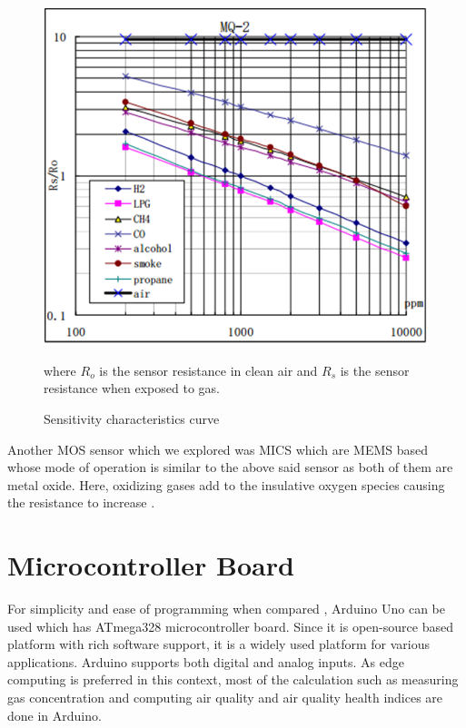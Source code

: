 \documentclass[11pt]{article}
\begin{document}
    \begin{figure}
      \begin{center}
      \includegraphics[scale=0.40]{images/figure1.png}
      \end{center}
      \caption{Sensitivity characteristics curve \cite{Data2012}}
      \label{mesh}
  
      where $R_{o}$ is the sensor resistance in clean air and $R_{s}$ is the sensor resistance when exposed to gas.
    \end{figure}
   \par
    Another MOS sensor which we explored was MICS which are MEMS based whose mode of operation is similar to the above said sensor as both of them are metal oxide. Here, oxidizing gases add to the insulative oxygen species causing the resistance to increase \cite{SGXSensortech}.



    
 \section* {Microcontroller Board}


 
 For simplicity and ease of programming when compared , Arduino Uno can be used which has ATmega328 microcontroller board. Since it is open-source based platform with rich software support, it is a widely used platform for various applications. Arduino supports both digital and analog inputs. As edge computing is preferred in this context, most of the calculation such as measuring gas concentration and computing air quality and air quality health indices are done in Arduino.
\end{document}
